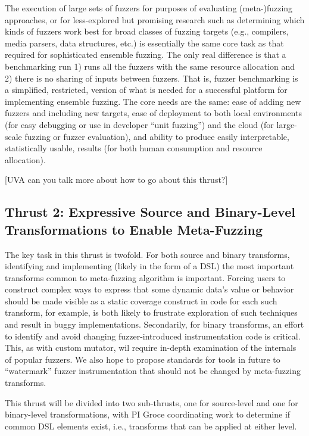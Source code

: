 \documentclass[numbers]{proposalnsf}
\begin{document}
The execution of large sets of fuzzers for purposes of evaluating (meta-)fuzzing approaches, or for less-explored but promising research such as determining which kinds of fuzzers work best for broad classes of fuzzing targets (e.g., compilers, media parsers, data structures, etc.) is essentially the same core task as that required for sophisticated ensemble fuzzing.  The only real difference is that a benchmarking run 1) runs all the fuzzers with the same resource allocation and 2) there is no sharing of inputs between fuzzers.  That is, fuzzer benchmarking is a simplified, restricted, version of what is needed for a successful platform for implementing ensemble fuzzing.  The core needs are the same: ease of adding new fuzzers and including new targets, ease of deployment to both local environments (for easy debugging or use in developer ``unit fuzzing'') and the cloud (for large-scale fuzzing or fuzzer evaluation), and ability to produce easily interpretable, statistically usable, results (for both human consumption and resource allocation).

[UVA can you talk more about how to go about this thrust?]

\subsection{Thrust 2: Expressive Source and Binary-Level Transformations to Enable Meta-Fuzzing}

The key task in this thrust is twofold.  For both source and binary transforms, identifying and implementing (likely in the form of a DSL) the most important transforms common to meta-fuzzing algorithm is important.  Forcing users to construct complex ways to express that some dynamic data's value or behavior should be made visible as a static coverage construct in code for each such transform, for example, is both likely to frustrate exploration of such techniques and result in buggy implementations.  Secondarily, for binary transforms, an effort to identify and avoid changing fuzzer-introduced instrumentation code is critical.  This, as with custom mutator, wil require in-depth examination of the internals of popular fuzzers.  We also hope to propose standards for tools in future to ``watermark'' fuzzer instrumentation that should not be changed by meta-fuzzing transforms.

This thrust will be divided into two sub-thrusts, one for source-level and one for binary-level transformations, with PI Groce coordinating work to determine if common DSL elements exist, i.e., transforms that can be applied at either level.
\end{document}
